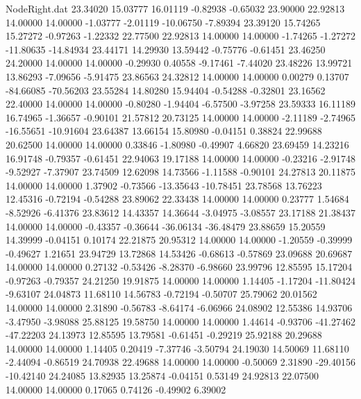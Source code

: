 \begin{filecontents}{NodeRight.dat}
  23.34020   15.03777   16.01119    -0.82938   -0.65032   23.90000   22.92813   14.00000   14.00000   -1.03777   -2.01119  -10.06750   -7.89394
  23.39120   15.74265   15.27272    -0.97263   -1.22332   22.77500   22.92813   14.00000   14.00000   -1.74265   -1.27272  -11.80635  -14.84934
  23.44171   14.29930   13.59442    -0.75776   -0.61451   23.46250   24.20000   14.00000   14.00000   -0.29930    0.40558   -9.17461   -7.44020
  23.48226   13.99721   13.86293    -7.09656   -5.91475   23.86563   24.32812   14.00000   14.00000    0.00279    0.13707  -84.66085  -70.56203
  23.55284   14.80280   15.94404    -0.54288   -0.32801   23.16562   22.40000   14.00000   14.00000   -0.80280   -1.94404   -6.57500   -3.97258
  23.59333   16.11189   16.74965    -1.36657   -0.90101   21.57812   20.73125   14.00000   14.00000   -2.11189   -2.74965  -16.55651  -10.91604
  23.64387   13.66154   15.80980    -0.04151    0.38824   22.99688   20.62500   14.00000   14.00000    0.33846   -1.80980   -0.49907    4.66820
  23.69459   14.23216   16.91748    -0.79357   -0.61451   22.94063   19.17188   14.00000   14.00000   -0.23216   -2.91748   -9.52927   -7.37907
  23.74509   12.62098   14.73566    -1.11588   -0.90101   24.27813   20.11875   14.00000   14.00000    1.37902   -0.73566  -13.35643  -10.78451
  23.78568   13.76223   12.45316    -0.72194   -0.54288   23.89062   22.33438   14.00000   14.00000    0.23777    1.54684   -8.52926   -6.41376
  23.83612   14.43357   14.36644    -3.04975   -3.08557   23.17188   21.38437   14.00000   14.00000   -0.43357   -0.36644  -36.06134  -36.48479
  23.88659   15.20559   14.39999    -0.04151    0.10174   22.21875   20.95312   14.00000   14.00000   -1.20559   -0.39999   -0.49627    1.21651
  23.94729   13.72868   14.53426    -0.68613   -0.57869   23.09688   20.69687   14.00000   14.00000    0.27132   -0.53426   -8.28370   -6.98660
  23.99796   12.85595   15.17204    -0.97263   -0.79357   24.21250   19.91875   14.00000   14.00000    1.14405   -1.17204  -11.80424   -9.63107
  24.04873   11.68110   14.56783    -0.72194   -0.50707   25.79062   20.01562   14.00000   14.00000    2.31890   -0.56783   -8.64174   -6.06966
  24.08902   12.55386   14.93706    -3.47950   -3.98088   25.88125   19.58750   14.00000   14.00000    1.44614   -0.93706  -41.27462  -47.22203
  24.13973   12.85595   13.79581    -0.61451   -0.29219   25.92188   20.29688   14.00000   14.00000    1.14405    0.20419   -7.37746   -3.50794
  24.19030   14.50069   11.68110    -2.44094   -0.86519   24.70938   22.49688   14.00000   14.00000   -0.50069    2.31890  -29.40156  -10.42140
  24.24085   13.82935   13.25874    -0.04151    0.53149   24.92813   22.07500   14.00000   14.00000    0.17065    0.74126   -0.49902    6.39002

\end{filecontents}
